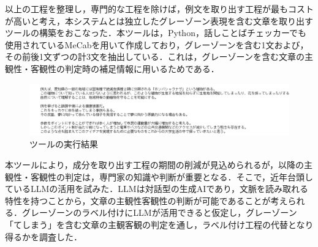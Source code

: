 以上の工程を整理し，専門的な工程を除けば，例文を取り出す工程が最もコストが高いと考え，本システムとは独立したグレーゾーン表現を含む文章を取り出すツールの構築をおこなった．本ツールは，Python，話しことばチェッカーでも使用されているMeCabを用いて作成しており，グレーゾーンを含む1文および，その前後1文ずつの計3文を抽出している．これは，グレーゾーンを含む文章の主観性・客観性の判定時の補足情報に用いるためである．

\begin{figure}[H]
	\centering
 	\includegraphics[width=150mm]{image/tool-grayfinder.png}
        \caption{ツールの実行結果}
	\label{grayfinder}
\end{figure}

本ツールにより，成分を取り出す工程の期間の削減が見込められるが，以降の主観性・客観性の判定は，専門家の知識や判断が重要となる．そこで，近年台頭しているLLMの活用を試みた．LLMは対話型の生成AIであり，文脈を読み取れる特性を持つことから，文章の主観性客観性の判断が可能であることが考えられる．グレーゾーンのラベル付けにLLMが活用できると仮定し，グレーゾーン「てしまう」を含む文章の主観客観の判定を通し，ラベル付け工程の代替となり得るかを調査した．